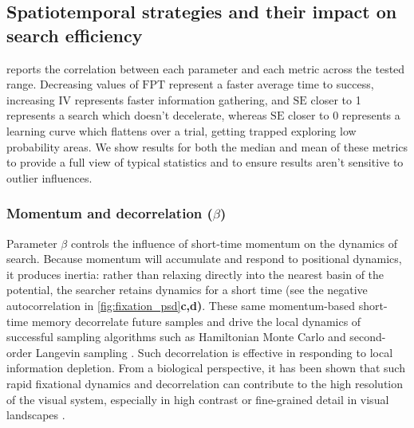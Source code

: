 \subsection*{Spatiotemporal strategies and their impact on search efficiency}

 reports the correlation between each parameter and each metric across the tested range. Decreasing values of $\mathrm{FPT}$ represent a faster average time to success, increasing $\mathrm{IV}$ represents faster information gathering, and $\mathrm{SE}$ closer to 1 represents a search which doesn't decelerate, whereas $\mathrm{SE}$ closer to 0 represents a learning curve which flattens over a trial, getting trapped exploring low probability areas. We show results for both the median and mean of these metrics to provide a full view of typical statistics and to ensure results aren't sensitive to outlier influences.

\subsubsection*{Momentum and decorrelation ($\beta$)}
Parameter $\beta$ controls the influence of short-time momentum on the dynamics of search. Because momentum will accumulate and respond to positional dynamics, it produces inertia: rather than relaxing directly into the nearest basin of the potential, the searcher retains dynamics for a short time (see the negative autocorrelation in \cref{fig:fixation_psd}\textbf{c,d)}. These same momentum-based short-time memory decorrelate future samples and drive the local dynamics of successful sampling algorithms such as Hamiltonian Monte Carlo \cite{betancourt_conceptual_2018} and second-order Langevin sampling \cite{liu2025secondorderensemblelangevin}. Such decorrelation is effective in responding to local information depletion. From a biological perspective, it has been shown that such rapid fixational dynamics and decorrelation can contribute to the high resolution of the visual system, especially in high contrast or fine-grained detail in visual landscapes \cite{rucci_miniature_2007}.



